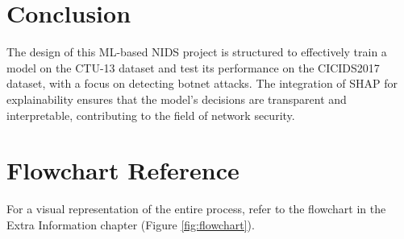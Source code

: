\section{Conclusion}
The design of this ML-based NIDS project is structured to effectively train a model on the CTU-13 dataset and test its performance on the CICIDS2017 dataset, with a focus on detecting botnet attacks. The integration of SHAP for explainability ensures that the model's decisions are transparent and interpretable, contributing to the field of network security.

\section{Flowchart Reference}
For a visual representation of the entire process, refer to the flowchart in the Extra Information chapter (Figure \ref{fig:flowchart}).
